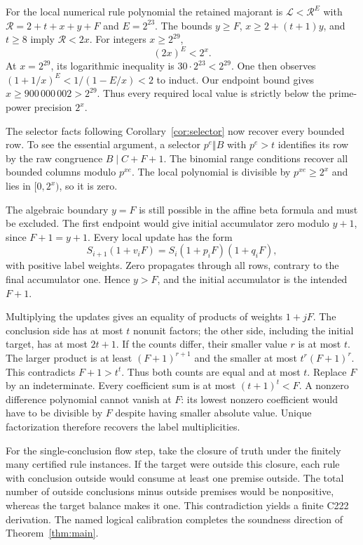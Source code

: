 \documentclass[11pt]{article}
\theoremstyle{remark}\newtheorem{remark}[theorem]{Remark}
\newcommand{\LL}{\mathcal L}
\begin{document}
For the local numerical rule polynomial the retained majorant is
$\LL<\mathcal R^E$ with
$\mathcal R=2+t+x+y+F$ and $E=2^{23}$. The bounds
$y\ge F$, $x\ge2+(t+1)y$, and $t\ge8$ imply $\mathcal R<2x$.
For integers $x\ge2^{29}$,
\[
                     (2x)^E<2^x.
\]
At $x=2^{29}$, its logarithmic inequality is
$30\cdot2^{23}<2^{29}$. One then observes
$(1+1/x)^E<1/(1-E/x)<2$ to induct. Our endpoint bound gives
$x\ge900\,000\,002>2^{29}$. Thus every required local value is
strictly below the prime-power precision $2^x$.

The selector facts following Corollary~\ref{cor:selector} now recover
every bounded row. To see the essential argument, a selector
$p^e\Vert B$ with $p^e>t$ identifies its row by the raw congruence
$B\mid C+F+1$. The binomial range conditions recover all bounded
columns modulo $p^{xe}$. The local polynomial is divisible by
$p^{xe}\ge2^x$ and lies in $[0,2^x)$, so it is zero.

The algebraic boundary $y=F$ is still possible in the affine beta
formula and must be excluded. The first endpoint would give initial
accumulator zero modulo $y+1$, since $F+1=y+1$. Every local update has
the form
\[
 S_{i+1}(1+v_iF)=S_i(1+p_iF)(1+q_iF),
\]
with positive label weights. Zero propagates through all rows, contrary
to the final accumulator one. Hence $y>F$, and the initial accumulator
is the intended $F+1$.

Multiplying the updates gives an equality of products of weights
$1+jF$. The conclusion side has at most $t$ nonunit factors; the other
side, including the initial target, has at most $2t+1$. If the counts
differ, their smaller value $r$ is at most $t$. The larger product is
at least $(F+1)^{r+1}$ and the smaller at most
$t^r(F+1)^r$. This contradicts $F+1>t^t$. Thus both counts are equal
and at most $t$. Replace $F$ by an indeterminate. Every coefficient
sum is at most $(t+1)^t<F$. A nonzero difference polynomial cannot
vanish at $F$: its lowest nonzero coefficient would have to be
divisible by $F$ despite having smaller absolute value. Unique
factorization therefore recovers the label multiplicities.

For the single-conclusion flow step, take the closure of truth under
the finitely many certified rule instances. If the target were outside
this closure, each rule with conclusion outside would consume at least
one premise outside. The total number of outside conclusions minus
outside premises would be nonpositive, whereas the target balance
makes it one. This contradiction yields a finite C222 derivation.
The named logical calibration completes
the soundness direction of Theorem~\ref{thm:main}.
\end{document}
